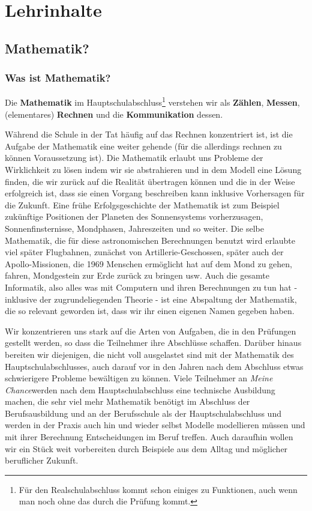 \documentclass[a4paper]{book}%
\newcommand{\meineChance}{\textit{Meine Chance}\xspace\index{Meine Chance}}
\theoremstyle{definition}
\begin{document}
\part{Lehrinhalte}

\chapter{Mathematik?}

\section{Was ist Mathematik?}

Die \textbf{Mathematik} im Hauptschulabschluss\footnote{Für den Realschulabschluss kommt schon einiges zu Funktionen, auch wenn man noch ohne das durch die Prüfung kommt.} verstehen wir als \textbf{Zählen}, \textbf{Messen}, (elementares) \textbf{Rechnen} und die \textbf{Kommunikation} dessen.

Während die Schule in der Tat häufig auf das Rechnen konzentriert ist, ist die Aufgabe der Mathematik eine weiter gehende (für die allerdings rechnen zu können Voraussetzung ist). Die Mathematik erlaubt uns Probleme der Wirklichkeit zu lösen indem wir sie abstrahieren und in dem Modell eine Lösung finden, die wir zurück auf die Realität übertragen können und die in der Weise erfolgreich ist, dass sie einen Vorgang beschreiben kann inklusive Vorhersagen für die Zukunft. Eine frühe Erfolgsgeschichte der Mathematik ist zum Beispiel zukünftige Positionen der Planeten des Sonnensystems vorherzusagen, Sonnenfinsternisse, Mondphasen, Jahreszeiten und so weiter. Die selbe Mathematik, die für diese astronomischen Berechnungen benutzt wird erlaubte viel später Flugbahnen, zunächst von Artillerie-Geschossen, später auch der Apollo-Missionen, die 1969 Menschen ermöglicht hat auf dem Mond zu gehen, fahren, Mondgestein zur Erde zurück zu bringen usw. Auch die gesamte Informatik, also alles was mit Computern und ihren Berechnungen zu tun hat - inklusive der zugrundeliegenden Theorie - ist eine Abspaltung der Mathematik, die so relevant geworden ist, dass wir ihr einen eigenen Namen gegeben haben.

Wir konzentrieren uns stark auf die Arten von Aufgaben, die in den Prüfungen gestellt werden, so dass die Teilnehmer ihre Abschlüsse schaffen. Darüber hinaus bereiten wir diejenigen, die nicht voll ausgelastet sind mit der Mathematik des Hauptschulabschlusses, auch darauf vor in den Jahren nach dem Abschluss etwas schwierigere Probleme bewältigen zu können. Viele Teilnehmer an \meineChance werden nach dem Hauptschulabschluss eine technische Ausbildung machen, die sehr viel mehr Mathematik benötigt im Abschluss der Berufsausbildung und an der Berufsschule als der Hauptschulabschluss und werden in der Praxis auch hin und wieder selbst Modelle modellieren müssen und mit ihrer Berechnung Entscheidungen im Beruf treffen. Auch daraufhin wollen wir ein Stück weit vorbereiten durch Beispiele aus dem Alltag und möglicher beruflicher Zukunft.
\end{document}
